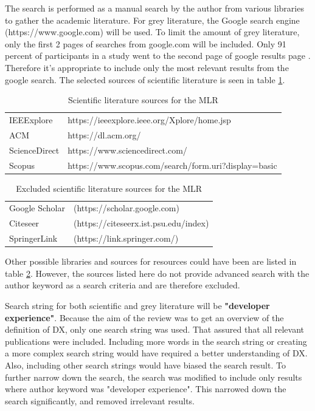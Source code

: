 \documentclass[english, 12pt, a4paper, sci, utf8, a-1b, online]{aaltothesis}
\begin{document}
The search is performed as a manual search by the author from various libraries to gather the academic literature. For grey literature, the Google search engine (https://www.google.com) will be used. To limit the amount of grey literature, only the first 2 pages of searches from google.com will be included. Only 91 percent of participants in a study went to the second page of google results page \citep{google-search}. Therefore it's appropriate to include only the most relevant results from the google search. The selected sources of scientific literature is seen in table \ref{table:included-sources}.

\begin{table}
  \centering
  \begin{tabular}{ l l }
    \hline
    IEEExplore    & https://ieeexplore.ieee.org/Xplore/home.jsp          \\
    ACM           & https://dl.acm.org/                                  \\
    ScienceDirect & https://www.sciencedirect.com/                       \\
    Scopus        & https://www.scopus.com/search/form.uri?display=basic \\
    \hline
  \end{tabular}
  \caption{Scientific literature sources for the MLR}
  \label{table:included-sources}
\end{table}

\begin{table}
  \centering
  \begin{tabular}{ l l }
    \hline
    Google Scholar & (https://scholar.google.com)          \\
    Citeseer       & (https://citeseerx.ist.psu.edu/index) \\
    SpringerLink   & (https://link.springer.com/)          \\
    \hline
  \end{tabular}
  \caption{Excluded scientific literature sources for the MLR}
  \label{table:excluded-sources}
\end{table}

Other possible libraries and sources for resources could have been are listed in table \ref{table:excluded-sources}. However, the sources listed here do not provide advanced search with the author keyword as a search criteria and are therefore excluded.

Search string for both scientific and grey literature will be \textbf{"developer experience"}. Because the aim of the review was to get an overview of the definition of DX, only one search string was used. That assured that all relevant publications were included. Including more words in the search string or creating a more complex search string would have required a better understanding of DX. Also, including other search strings would have biased the search result. To further narrow down the search, the search was modified to include only results where author keyword was "developer experience". This narrowed down the search significantly, and removed irrelevant results.
\end{document}
